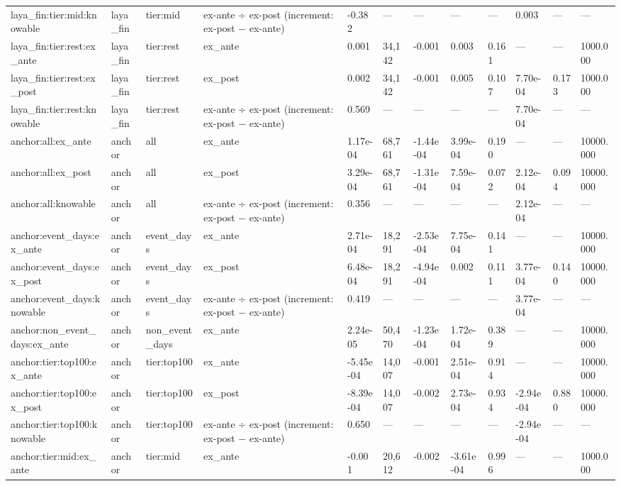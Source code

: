 \begin{tabular}{llllllllllll}
laya\_fin:tier:mid:knowable & laya\_fin & tier:mid & ex-ante ÷ ex-post (increment: ex-post − ex-ante) & -0.382 & — & — & — & — & 0.003 & — & — \\
laya\_fin:tier:rest:ex\_ante & laya\_fin & tier:rest & ex\_ante & 0.001 & 34,142 & -0.001 & 0.003 & 0.161 & — & — & 1000.000 \\
laya\_fin:tier:rest:ex\_post & laya\_fin & tier:rest & ex\_post & 0.002 & 34,142 & -0.001 & 0.005 & 0.107 & 7.70e-04 & 0.173 & 1000.000 \\
laya\_fin:tier:rest:knowable & laya\_fin & tier:rest & ex-ante ÷ ex-post (increment: ex-post − ex-ante) & 0.569 & — & — & — & — & 7.70e-04 & — & — \\
anchor:all:ex\_ante & anchor & all & ex\_ante & 1.17e-04 & 68,761 & -1.44e-04 & 3.99e-04 & 0.190 & — & — & 10000.000 \\
anchor:all:ex\_post & anchor & all & ex\_post & 3.29e-04 & 68,761 & -1.31e-04 & 7.59e-04 & 0.072 & 2.12e-04 & 0.094 & 10000.000 \\
anchor:all:knowable & anchor & all & ex-ante ÷ ex-post (increment: ex-post − ex-ante) & 0.356 & — & — & — & — & 2.12e-04 & — & — \\
anchor:event\_days:ex\_ante & anchor & event\_days & ex\_ante & 2.71e-04 & 18,291 & -2.53e-04 & 7.75e-04 & 0.141 & — & — & 10000.000 \\
anchor:event\_days:ex\_post & anchor & event\_days & ex\_post & 6.48e-04 & 18,291 & -4.94e-04 & 0.002 & 0.111 & 3.77e-04 & 0.140 & 10000.000 \\
anchor:event\_days:knowable & anchor & event\_days & ex-ante ÷ ex-post (increment: ex-post − ex-ante) & 0.419 & — & — & — & — & 3.77e-04 & — & — \\
anchor:non\_event\_days:ex\_ante & anchor & non\_event\_days & ex\_ante & 2.24e-05 & 50,470 & -1.23e-04 & 1.72e-04 & 0.389 & — & — & 10000.000 \\
anchor:tier:top100:ex\_ante & anchor & tier:top100 & ex\_ante & -5.45e-04 & 14,007 & -0.001 & 2.51e-04 & 0.914 & — & — & 10000.000 \\
anchor:tier:top100:ex\_post & anchor & tier:top100 & ex\_post & -8.39e-04 & 14,007 & -0.002 & 2.73e-04 & 0.934 & -2.94e-04 & 0.880 & 10000.000 \\
anchor:tier:top100:knowable & anchor & tier:top100 & ex-ante ÷ ex-post (increment: ex-post − ex-ante) & 0.650 & — & — & — & — & -2.94e-04 & — & — \\
anchor:tier:mid:ex\_ante & anchor & tier:mid & ex\_ante & -0.001 & 20,612 & -0.002 & -3.61e-04 & 0.996 & — & — & 1000.000 \\

\end{tabular}
